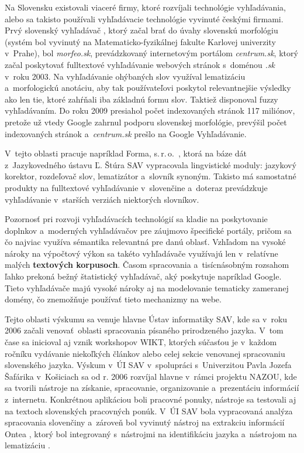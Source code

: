 \begin{multicols}{2}
Na Slovensku existovali viaceré firmy, ktoré rozvíjali
technológie vyhľadávania, alebo sa takisto používali vyhľadávacie technológie
vyvinuté českými firmami. Prvý slovenský vyhľadávač , ktorý začal brať
do úvahy slovenskú morfológiu (systém bol vyvinutý na Matematicko-fyzikálnej
fakulte Karlovej univerzity v~Prahe), bol \emph{morfeo.sk}, prevádzkovaný
internetovým portálom \emph{centrum.sk}, ktorý začal poskytovať fulltextové
vyhľadávanie webových stránok s~doménou \emph{.sk} v~roku 2003. Na vyhľadávanie
ohýbaných slov využíval lematizáciu a~morfologickú anotáciu, aby tak
používateľovi poskytol relevantnejšie výsledky ako len tie, ktoré zahŕňali iba
základnú formu slov. Taktiež disponoval fuzzy vyhľadávaním. Do roku 2009 presiahol počet
indexovaných stránok 117 miliónov, pretože už vtedy Google zahrnul podporu
slovenskej morfológie, prevýšil počet indexovaných stránok a~\emph{centrum.sk}
prešlo na Google Vyhľadávanie.

V~tejto oblasti pracuje napríklad Forma, s.\,r.\,o.~\cite{f25}, ktorá na báze dát z~Jazykovedného ústavu Ľ. Štúra SAV vypracovala lingvistické moduly: jazykový korektor, rozdeľovač slov, lematizátor a~slovník synoným. Takisto má samostatné produkty na fulltextové vyhľadávanie v~slovenčine a~doteraz prevádzkuje vyhľadávanie v~starších verziách niektorých slovníkov.

Pozornosť pri rozvoji vyhľadávacích technológií sa kladie na poskytovanie doplnkov a~moderných vyhľadávačov pre záujmovo špecifické portály, pričom sa čo najviac využíva sémantika relevantná pre danú oblasť. Vzhľadom na vysoké nároky na výpočtový výkon sa takéto vyhľadávače využívajú len v~relatívne malých \textbf{textových korpusoch}. Časom spracovania a~tisícnásobným rozsahom ľahko prekoná bežný štatistický vyhľadávač, aký poskytuje napríklad Google. Tieto vyhľadávače majú vysoké nároky aj na modelovanie tematicky zameranej domény, čo znemožňuje používať tieto mechanizmy na webe. 

Tejto oblasti výskumu sa venuje hlavne Ústav informatiky SAV, kde sa v~roku 2006 začali venovať~oblasti spracovania písaného prirodzeného jazyka. V~tom čase sa inicioval aj vznik workshopov WIKT\cite{f26}, ktorých súčasťou je v~každom ročníku vydávanie niekoľkých článkov alebo celej sekcie venovanej spracovaniu slovenského jazyka. Výskum v~ÚI SAV v~spolupráci s~Univerzitou Pavla Jozefa Šafárika v~Košiciach sa od r. 2006 rozvíjal hlavne v~rámci projektu NAZOU\cite{f27}, kde sa tvorili nástroje na získanie, spracovanie, organizovanie a~prezentáciu informácií z~internetu. Konkrétnou aplikáciou boli pracovné ponuky, nástroje sa testovali aj na textoch slovenských pracovných ponúk. V~ÚI SAV bola vypracovaná analýza spracovania slovenčiny \cite{laclavik2007a} a~zároveň bol vyvinutý nástroj na extrakciu informácií Ontea\cite{f28} \cite{laclavik2007b,laclavik2009}, ktorý bol integrovaný s~nástrojmi na identifikáciu jazyka \cite{vojtek2006} a~nástrojom na lematizáciu \cite{krajci2007}.


\end{multicols}
